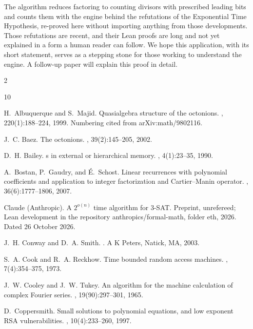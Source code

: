 \documentclass[11pt]{article}
\begin{document}
The algorithm reduces factoring to counting divisors with prescribed leading bits and counts them with the
engine behind the refutations of the Exponential Time Hypothesis, re-proved here without importing anything
from those developments. Those refutations are recent, and their Lean proofs are long and not yet explained in a
form a human reader can follow. We hope this application, with its short statement, serves as a stepping stone
for those working to understand the engine. A follow-up paper will explain this proof in detail.

\begin{multicols}{2}
\begin{thebibliography}{10}

H.~Albuquerque and S.~Majid.
\newblock Quasialgebra structure of the octonions.
, 220(1):188--224, 1999.
\newblock Numbering cited from arXiv:math/9802116.

J.~C. Baez.
\newblock The octonions.
, 39(2):145--205,
  2002.

D.~H. Bailey.
s in external or hierarchical memory.
, 4(1):23--35, 1990.

A.~Bostan, P.~Gaudry, and {\'E}.~Schost.
\newblock Linear recurrences with polynomial coefficients and application to
  integer factorization and {C}artier--{M}anin operator.
, 36(6):1777--1806, 2007.

{Claude (Anthropic)}.
\newblock A $2^{o(n)}$ time algorithm for 3-{SAT}.
\newblock Preprint, unrefereed; Lean development in the repository
  anthropics/formal-math, folder eth, 2026.
\newblock Dated 26 October 2026.

J.~H. Conway and D.~A. Smith.
.
\newblock A K Peters, Natick, MA, 2003.

S.~A. Cook and R.~A. Reckhow.
\newblock Time bounded random access machines.
, 7(4):354--375, 1973.

J.~W. Cooley and J.~W. Tukey.
\newblock An algorithm for the machine calculation of complex {F}ourier series.
, 19(90):297--301, 1965.

D.~Coppersmith.
\newblock Small solutions to polynomial equations, and low exponent {RSA}
  vulnerabilities.
, 10(4):233--260, 1997.


\end{thebibliography}
\end{multicols}
\end{document}
